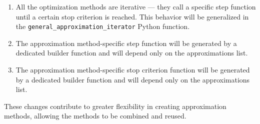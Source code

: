 \documentclass[11pt]{article}
\begin{document}
\begin{enumerate}
\def\labelenumi{\arabic{enumi}.}
\item
  All the optimization methods are iterative --- they call a specific
  step function until a certain stop criterion is reached. This behavior
  will be generalized in the \texttt{general\_approximation\_iterator}
  Python function.
\item
  The approximation method-specific step function will be generated by a
  dedicated builder function and will depend only on the approximations
  list.
\item
  The approximation method-specific stop criterion function will be
  generated by a dedicated builder function and will depend only on the
  approximations list.
\end{enumerate}

These changes contribute to greater flexibility in creating
approximation methods, allowing the methods to be combined and reused.
\end{document}
